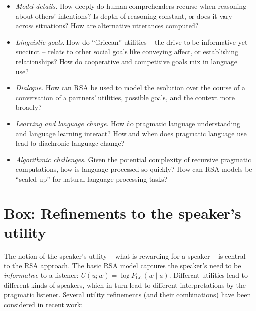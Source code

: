 \documentclass[]{elsarticle}
\begin{document}
\begin{itemize}
\item \emph{Model details.} How deeply do human comprehenders recurse when
  reasoning about others' intentions? Is depth of reasoning constant, or
  does it vary across situations? How are alternative utterances
  computed?

%
\item \emph{Linguistic goals}. How do ``Gricean'' utilities -- the drive to be informative yet succinct -- relate to other social goals like conveying affect, or establishing relationships? How do cooperative and competitive goals mix in language use?

\item \emph{Dialogue}. How can RSA be used to model the evolution over the course of a conversation of a partners' utilities, possible goals, and the context more broadly?

 \item \emph{Learning and language change}. How do pragmatic language understanding and language learning interact? How and when does pragmatic language use lead to diachronic language change?

\item \emph{Algorithmic challenges}. Given the potential complexity of
recursive pragmatic computations, how is language processed so quickly? How can RSA models be ``scaled up'' for natural language
  processing tasks?
%

\end{itemize}

\section{Box: Refinements to the speaker's utility}\label{box-refinements-to-the-speakers-utility}

The notion of the speaker's utility -- what is rewarding for a speaker -- is central to the RSA approach. The basic RSA model captures the speaker's need to be \emph{informative} to a listener: $U(u; w) = \log P_{\text{Lit}}(w\mid u)$. Different utilities lead to different kinds of
speakers, which in turn lead to different interpretations by the pragmatic
listener. Several utility refinements (and their combinations) have been
considered in recent work:
\end{document}
